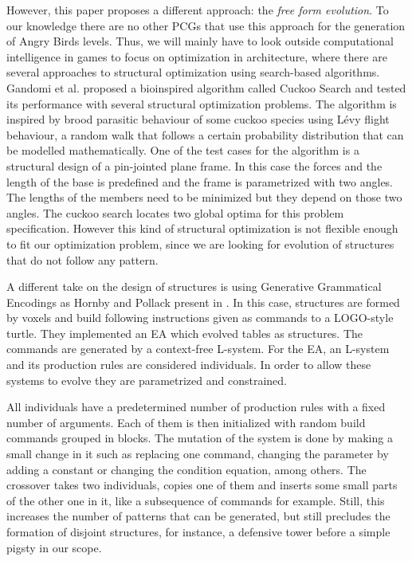 \documentclass[runningheads,a4paper]{llncs}
\begin{document}
However, this paper proposes a different approach: the \textit{free
  form evolution}. To our knowledge there are no other PCGs that
use this approach for the generation of Angry Birds levels. 
Thus, we will mainly have to look outside computational intelligence in
games to focus on optimization in architecture, where there are
several approaches to structural optimization using search-based
algorithms. Gandomi et al. \cite{gandomi2013cuckoo} proposed a
bioinspired algorithm called Cuckoo Search and tested its performance
with several structural optimization problems. The  
algorithm is inspired by brood parasitic behaviour of some cuckoo
species using Lévy flight behaviour, a random walk that follows a certain 
probability distribution that can be modelled mathematically.
One of the test cases for the algorithm is a structural design of a pin-jointed 
plane frame. In this case the forces and the length of the base is predefined 
and the frame is parametrized with two angles. The lengths of the members need 
to be minimized but they depend on those two angles. The cuckoo search locates 
two global optima for this problem specification. However this kind of 
structural optimization is not flexible enough to fit our optimization
problem, since we are looking for evolution of structures that do not
follow any pattern.

A different take on the design of structures is using Generative Grammatical 
Encodings as Hornby and Pollack present in
\cite{hornby2001advantages}. In this case, structures are formed by
voxels and build following instructions given as commands to a
LOGO-style turtle. They implemented an EA which evolved tables as
structures. The commands are generated by a context-free L-system. For
the EA, an L-system and its production rules are considered
individuals. In order to allow these systems to evolve they are
parametrized and constrained.

All individuals have a predetermined number of production rules with a fixed 
number of arguments. Each of them is then initialized with random build 
commands grouped in blocks. The mutation of the system is done by making a 
small change in it such as replacing one command, changing the parameter by 
adding a constant or changing the condition equation, among others. The 
crossover takes two individuals, copies one of them and inserts some small 
parts of the other one in it, like a subsequence of commands for
example. Still, this increases the number of patterns that can be
generated, but still precludes the formation of disjoint structures, for instance, a defensive tower before a simple pigsty in our scope. 
\end{document}
